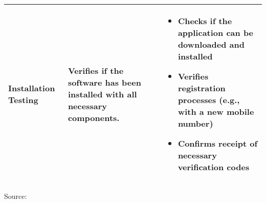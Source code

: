 \begin{longtable}{@{}p{3cm}p{6cm}p{5cm}@{}}
    Installation Testing & Verifies if the software has been installed with all necessary components. &  
    \begin{itemize}[leftmargin=*,nosep,after=\vspace{-\baselineskip}Context]
        \item Checks if the application can be downloaded and installed
        \item Verifies registration processes (e.g., with a new mobile number)
        \item Confirms receipt of necessary verification codes
    \end{itemize} \\
    \midrule
\end{longtable}
\centering 
\footnotesize Source: \cite{khan2011different, meenakshi2014software}